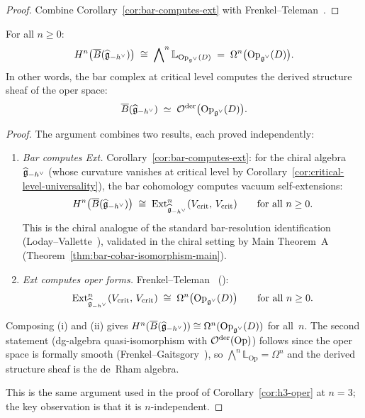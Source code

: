 \begin{proof}
Combine Corollary~\ref{cor:bar-computes-ext} with
Frenkel--Teleman~\cite{FT06}.
\end{proof}

\begin{theorem}
\label{thm:oper-bar-dl}
For all $n \geq 0$:
\begin{equation}\label{eq:hn-oper}
H^n\bigl(\overline{B}(\widehat{\mathfrak{g}}_{-h^\vee})\bigr)
\;\cong\;
\bigwedge\nolimits^n
\mathbb{L}_{\mathrm{Op}_{\mathfrak{g}^\vee}(D)}
\;=\;
\Omega^n\bigl(\mathrm{Op}_{\mathfrak{g}^\vee}(D)\bigr).
\end{equation}
In other words, the bar complex at critical level computes the
derived structure sheaf of the oper space:
\[
\overline{B}(\widehat{\mathfrak{g}}_{-h^\vee})
\;\simeq\;
\mathcal{O}^{\mathrm{der}}\bigl(\mathrm{Op}_{\mathfrak{g}^\vee}(D)\bigr).
\]
\end{theorem}

\begin{proof}
The argument combines two results, each proved independently:
\begin{enumerate}[label=\textup{(\roman*)}]
\item \emph{Bar computes Ext.}\quad
  Corollary~\ref{cor:bar-computes-ext}: for the chiral algebra
  $\widehat{\mathfrak{g}}_{-h^\vee}$ (whose curvature vanishes at critical
  level by Corollary~\ref{cor:critical-level-universality}), the
  bar cohomology computes vacuum self-extensions:
  \[
  H^n\bigl(\overline{B}(\widehat{\mathfrak{g}}_{-h^\vee})\bigr)
  \;\cong\;
  \mathrm{Ext}^n_{\widehat{\mathfrak{g}}_{-h^\vee}}
  (V_{\mathrm{crit}},\, V_{\mathrm{crit}})
  \qquad \text{for all } n \geq 0.
  \]
  This is the chiral analogue of the standard bar-resolution
  identification (Loday--Vallette~\cite{LV12}), validated in the
  chiral setting by Main Theorem~A
  (Theorem~\ref{thm:bar-cobar-isomorphism-main}).
\item \emph{Ext computes oper forms.}\quad
  Frenkel--Teleman~\cite{FT06} (\ClaimStatusProvedElsewhere):
  \[
  \mathrm{Ext}^n_{\widehat{\mathfrak{g}}_{-h^\vee}}
  (V_{\mathrm{crit}},\, V_{\mathrm{crit}})
  \;\cong\;
  \Omega^n\bigl(\mathrm{Op}_{\mathfrak{g}^\vee}(D)\bigr)
  \qquad \text{for all } n \geq 0.
  \]
\end{enumerate}
Composing (i) and (ii) gives $H^n(\overline{B}(\widehat{\mathfrak{g}}_{-h^\vee}))
\cong \Omega^n(\mathrm{Op}_{\mathfrak{g}^\vee}(D))$ for all~$n$.
The second statement (dg-algebra quasi-isomorphism with
$\mathcal{O}^{\mathrm{der}}(\mathrm{Op})$) follows since the oper space
is formally smooth (Frenkel--Gaitsgory~\cite{FG06}), so
$\bigwedge^n \mathbb{L}_{\mathrm{Op}} = \Omega^n$ and the
derived structure sheaf is the de~Rham algebra.

This is the same argument used in the proof of
Corollary~\ref{cor:h3-oper} at $n = 3$; the key observation is
that it is $n$-independent.
\end{proof}

